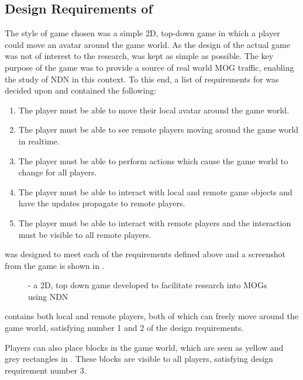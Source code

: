 \subsection{Design Requirements of \game{}}
The style of game chosen was a simple 2D, top-down game in which a player could move an avatar around the game world. As the design of the actual game was not of interest to the research, \game{} was kept as simple as possible. The key purpose of the game was to provide a source of real world MOG traffic, enabling the study of NDN in this context. To this end, a list of requirements for \game{} was decided upon and contained the following:

\begin{enumerate}
    \item The player must be able to move their local avatar around the game world.
    \item The player must be able to see remote players moving around the game world in realtime.
    \item The player must be able to perform actions which cause the game world to change for all players.
    \item The player must be able to interact with local and remote game objects and have the updates propagate to remote players.
    \item The player must be able to interact with remote players and the interaction must be visible to all remote players.
\end{enumerate}

\game{} was designed to meet each of the requirements defined above and a screenshot from the game is shown in .

\begin{figure}[H]
    \centering
    \caption{\game{} - a 2D, top down game developed to facilitate research into MOGs using NDN}
    \label{fig:des:2d-game}
\end{figure}

\game{} contains both local and remote players, both of which can freely move around the game world, satisfying number 1 and 2 of the design requirements.

Players can also place blocks in the game world, which are seen as yellow and grey rectangles in . These blocks are visible to all players, satisfying design requirement number 3.

